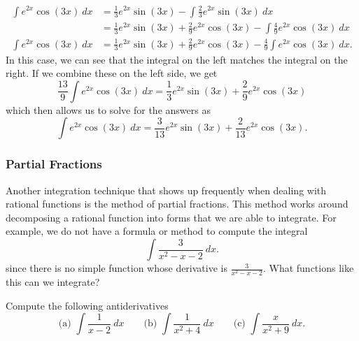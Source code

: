 \documentclass{ximera}
\begin{document}
\begin{exampleSol}
\begin{enumerate}
\[\begin{split}
                    \int e^{2x}\cos(3x)\ dx &= \frac{1}{3}e^{2x}\sin(3x) - \int \frac{2}{3}e^{2x}\sin(3x)\ dx \\
                    &= \frac{1}{3}e^{2x}\sin(3x)  + \frac{2}{9}e^{2x}\cos(3x) - \int \frac{4}{9}e^{2x}\cos(3x)\ dx \\
                    \int e^{2x}\cos(3x)\ dx &= \frac{1}{3}e^{2x}\sin(3x)  + \frac{2}{9}e^{2x}\cos(3x)- \frac{4}{9}\int e^{2x}\cos(3x)\ dx.
                \end{split} 
            \]
            In this case, we can see that the integral on the left matches the integral on the right. If we combine these on the left side, we get
            \[ 
                \frac{13}{9} \int e^{2x}\cos(3x)\ dx = \frac{1}{3}e^{2x}\sin(3x)  + \frac{2}{9}e^{2x}\cos(3x) 
            \] 
            which then allows us to solve for the answers as
            \[ 
                \int e^{2x}\cos(3x)\ dx = \frac{3}{13}e^{2x}\sin(3x)  + \frac{2}{13}e^{2x}\cos(3x). 
            \]
    \end{enumerate}
\end{exampleSol}

\subsubsection{Partial Fractions}

Another integration technique that shows up frequently when dealing with rational functions is the method of partial fractions. This method works around decomposing a rational function into forms that we are able to integrate. For example, we do not have a formula or method to compute the integral
\begin{equation*}
    \int \frac{3}{x^2 - x - 2} \ dx.
\end{equation*}
since there is no simple function whose derivative is $\frac{3}{x^2 - x - 2}$. What functions like this can we integrate?

\begin{example} \label{ex:PFPossible}
    Compute the following antiderivatives
    \begin{equation*}
        \text{(a) } \int \frac{1}{x-2} \ dx \qquad \text{(b) } \int \frac{1}{x^2 + 4}\ dx \qquad \text{(c) } \int \frac{x}{x^2 + 9}\ dx.
    \end{equation*}
\end{example}
\end{document}
